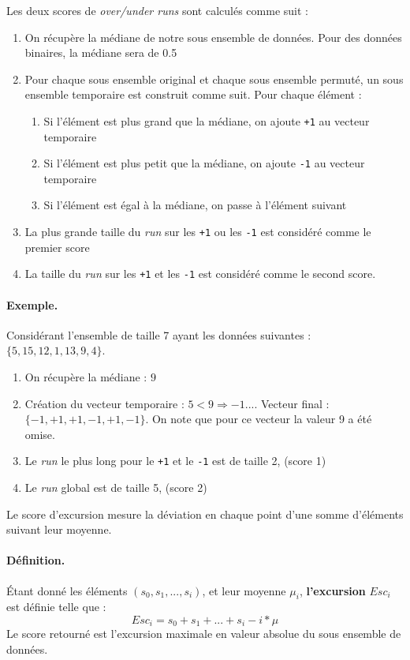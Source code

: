  
Les deux scores de \textit{over/under runs} sont calculés comme suit : 
\begin{enumerate}
\item On récupère la médiane de notre sous ensemble de données. Pour des données binaires, la médiane sera de 0.5
\item Pour chaque sous ensemble original et chaque sous ensemble permuté, un sous ensemble temporaire est construit comme suit. Pour chaque élément : 
	\begin{enumerate}
	\item Si l'élément est plus grand que la médiane, on ajoute \texttt{+1} au vecteur temporaire
 	\item Si l'élément est plus petit que la médiane, on ajoute \texttt{-1} au vecteur temporaire
	\item Si l'élément est égal à la médiane, on passe à l'élément suivant	
	\end{enumerate}
\item La plus grande taille du \textit{run} sur les \texttt{+1} ou les \texttt{-1} est considéré comme le premier score 
\item La taille du \textit{run} sur les \texttt{+1} et les \texttt{-1} est considéré comme le second score.
\end{enumerate}

\paragraph{Exemple.\\}
Considérant l'ensemble de taille 7 ayant les données suivantes : $\lbrace 5,15,12,1,13,9,4\rbrace$.
\begin{enumerate}
\item On récupère la médiane : $9$
\item Création du vecteur temporaire : $5<9 \Rightarrow -1 ...$. Vecteur final : $\lbrace -1, +1,+1,-1,+1,-1 \rbrace$. On note que pour ce vecteur la valeur 9 a été omise.
\item Le \textit{run} le plus long pour le \texttt{+1} et le \texttt{-1} est de taille 2, (score 1)
\item Le \textit{run} global est de taille 5, (score 2)
\end{enumerate}

Le score d'excursion mesure la déviation en chaque point d'une somme d'éléments suivant leur moyenne.

\paragraph{Définition.\\}
 Étant donné les éléments $(s_0,s_1,...,s_i)$, et leur moyenne $\mu_i$, \textbf{l'excursion} $Esc_i$ est définie telle que :
 $$ Esc_i= s_0+ s_1 + ... + s_i - i*\mu$$ 
Le score retourné est l'excursion maximale en valeur absolue du sous ensemble de données. \\

